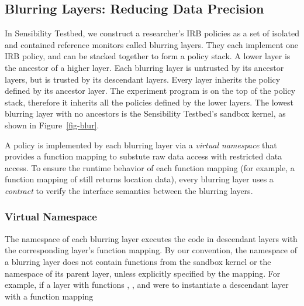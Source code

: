 
\subsection{Blurring Layers: Reducing Data Precision}\label{sec-layer}


In Sensibility Testbed, we construct a researcher's IRB policies as a set of 
isolated and contained reference monitors called blurring layers. They each
implement one IRB policy, and can 
be stacked together to form a policy stack. A lower layer is the ancestor of 
a higher layer. Each blurring layer is untrusted by its ancestor layers, 
but is trusted by its descendant layers. Every layer inherits the policy 
defined by its ancestor layer. The experiment program is on the top 
of the policy stack, therefore it inherits all the policies defined by the
lower layers. The lowest blurring layer with no ancestors is the 
Sensibility Testbed's sandbox kernel, as shown in Figure~\ref{fig-blur}. 

A policy is implemented by each blurring layer via a \textit{virtual 
namespace} that provides a function mapping to substute raw 
data access with restricted data access. 
To ensure the runtime behavior of each function mapping (for example, 
a function mapping of  still returns location data), 
every blurring layer uses a \textit{contract} to verify the interface 
semantics between the blurring layers.

\subsubsection{Virtual Namespace}

The namespace of each blurring layer executes the code in descendant 
layers with the corresponding layer's function mapping. By our convention, 
the namespace of a blurring layer does not contain functions from the 
sandbox kernel or the namespace of its parent layer, unless explicitly 
specified by the mapping. For example, if a layer  with 
functions , , and 
 were to instantiate a descendant 
layer  with a function mapping 

